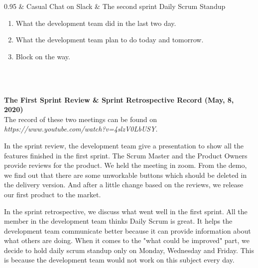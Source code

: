 \begin{tabularx}{0.95\linewidth}
  & Casual Chat on Slack
  & 
  The second sprint Daily Scrum Standup
  \begin{enumerate}
    \item What the development team did in the last two day.
    \item What the development team plan to do today and tomorrow.
    \item Block on the way.
  \end{enumerate}
  \\
  \bottomrule
  \\
  \caption{Agenda}  
  \label{tab:agenda}
\end{tabularx}

\textbf{The First Sprint Review \& Sprint Retrospective Record (May, 8, 2020)}
\\
The record of these two meetings can be found on \textit{https://www.youtube.com/watch?v=4slzV0LbUSY}.

In the sprint review, the development team give a presentation to show all the features finished in the first sprint. The Scrum Master and the Product Owners provide reviews for the product. We held the meeting in zoom. From the demo, we find out that there are some unworkable buttons which should be deleted in the delivery version. And after a little change based on the reviews, we release our first product to the market.

In the sprint retrospective, we discuss what went well in the first sprint. All the member in the development team thinks Daily Scrum is great. It helps the development team communicate better because it can provide information about what others are doing. When it comes to the "what could be improved" part, we decide to hold daily scrum standup only on Monday, Wednesday and Friday. This is because the development team would not work on this subject every day.

